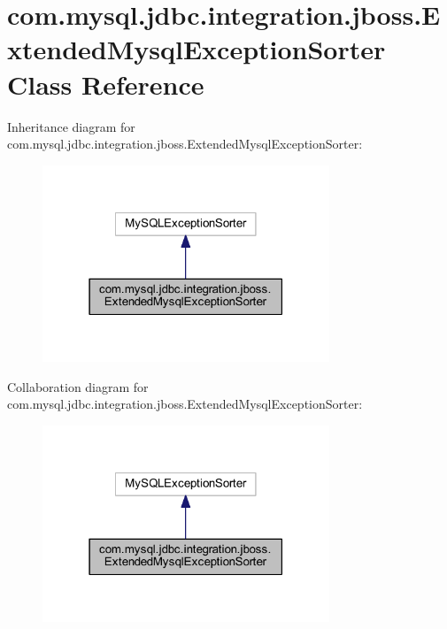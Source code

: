 \hypertarget{classcom_1_1mysql_1_1jdbc_1_1integration_1_1jboss_1_1_extended_mysql_exception_sorter}{}\section{com.\+mysql.\+jdbc.\+integration.\+jboss.\+Extended\+Mysql\+Exception\+Sorter Class Reference}
\label{classcom_1_1mysql_1_1jdbc_1_1integration_1_1jboss_1_1_extended_mysql_exception_sorter}


Inheritance diagram for com.\+mysql.\+jdbc.\+integration.\+jboss.\+Extended\+Mysql\+Exception\+Sorter\+:
\nopagebreak
\begin{figure}[H]
\begin{center}
\leavevmode
\includegraphics[width=243pt]{classcom_1_1mysql_1_1jdbc_1_1integration_1_1jboss_1_1_extended_mysql_exception_sorter__inherit__graph}
\end{center}
\end{figure}


Collaboration diagram for com.\+mysql.\+jdbc.\+integration.\+jboss.\+Extended\+Mysql\+Exception\+Sorter\+:
\nopagebreak
\begin{figure}[H]
\begin{center}
\leavevmode
\includegraphics[width=243pt]{classcom_1_1mysql_1_1jdbc_1_1integration_1_1jboss_1_1_extended_mysql_exception_sorter__coll__graph}
\end{center}
\end{figure}
